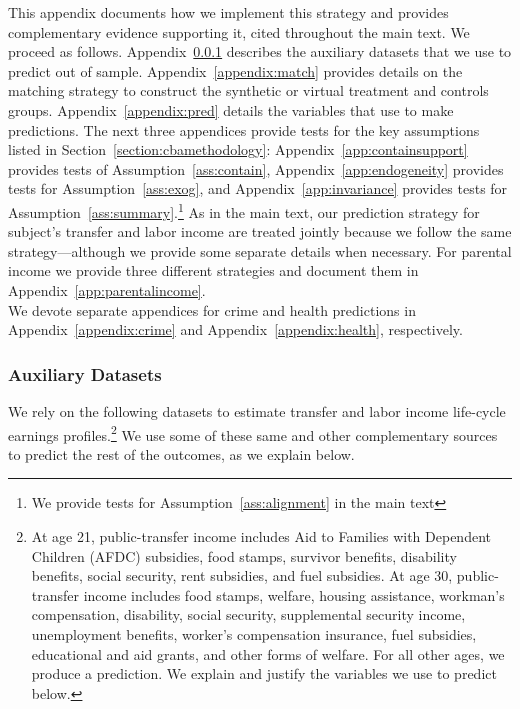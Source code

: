 \noindent This appendix documents how we implement this strategy and provides complementary evidence supporting it, cited throughout the main text. We proceed as follows. Appendix~\ref{app:datasets} describes the auxiliary datasets that we use to predict out of sample. Appendix~\ref{appendix:match} provides details on the matching strategy to construct the synthetic or virtual treatment and controls groups. Appendix~\ref{appendix:pred} details the variables that use to make predictions. The next three appendices provide tests for the key assumptions listed in Section~\ref{section:cbamethodology}: Appendix~\ref{app:containsupport} provides tests of Assumption~\ref{ass:contain}, Appendix~\ref{app:endogeneity} provides tests for Assumption~\ref{ass:exog}, and Appendix~\ref{app:invariance} provides tests for Assumption~\ref{ass:summary}.\footnote{We provide tests for Assumption~\ref{ass:alignment} in the main text} As in the main text, our prediction strategy for subject's transfer and labor income are treated jointly because we follow the same strategy---although we provide some separate details when necessary. For parental income we provide three different strategies and document them in Appendix~\ref{app:parentalincome}.\\ 

\noindent We devote separate appendices for crime and health predictions in Appendix~\ref{appendix:crime} and Appendix~\ref{appendix:health}, respectively.\\

\subsubsection{Auxiliary Datasets} \label{app:datasets}

\noindent We rely on the following datasets to estimate transfer and labor income life-cycle earnings profiles.\footnote{At age 21, public-transfer income includes Aid to Families with Dependent Children (AFDC) subsidies, food stamps, survivor benefits, disability benefits, social security, rent subsidies, and fuel subsidies. At age 30, public-transfer income includes food stamps, welfare, housing assistance, workman's compensation, disability, social security, supplemental security income, unemployment benefits, worker's compensation insurance, fuel subsidies, educational and aid grants, and other forms of welfare. For all other ages, we produce a prediction. We explain and justify the variables we use to predict below.} We use some of these same and other complementary sources to predict the rest of the outcomes, as we explain below.\\


